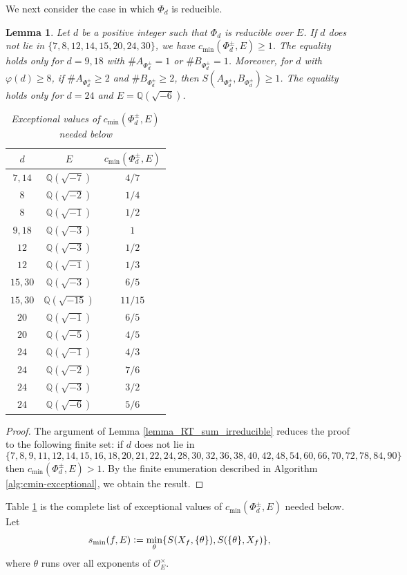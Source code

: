 \documentclass[11pt]{amsart}
\theoremstyle{plain}
\newtheorem{lem}[thm]{Lemma}
\theoremstyle{definition}
\numberwithin{equation}{section}
\def\OO{\mathscr{O}}
\newcommand{\bbQ}{\mathbb{Q}}
\newcommand{\defeq}{\vcentcolon=}
\begin{document}
We next consider the case in which $\Phi_d$ is reducible.
\begin{lem}\label{lemma_RT_sum_reducible}
  Let $d$ be a positive integer such that $\Phi_d$ is reducible over $E$.
  If $d$ does not lie in $\{7,8,12,14,15,20,24,30\}$, we have $c_{\min}(\Phi_d^\pm, E)\geq 1$.
  The equality holds only for $d = 9,18$ with $\#A_{\Phi^\pm_d} = 1$ or $\#B_{\Phi^\pm_d} = 1$.
  Moreover, for $d$ with $\varphi(d) \geq 8$, if $\#A_{\Phi^\pm_d}\geq2$ and $\#B_{\Phi^\pm_d}\geq2$, then
  $S(A_{\Phi^\pm_d},B_{\Phi^\pm_d}) \geq 1$.
  The equality holds only for $d=24$ and $E = \bbQ(\sqrt{-6})$.

\begin{table}[htbp]
  \centering
  \caption{Exceptional values of $c_{\min}(\Phi_d^\pm,E)$ needed below}
  \label{table_list_c<=1}
  \renewcommand{\arraystretch}{1.35}
  \setlength{\tabcolsep}{14pt}
  \begin{tabular}{ccc}
    \toprule
    $d$ & $E$ & $c_{\min}(\Phi_d^\pm,E)$ \\
    \midrule
    $7,14$ & $\bbQ(\sqrt{-7})$ & $4/7$ \\
    \addlinespace
    $8$ & $\bbQ(\sqrt{-2})$ & $1/4$ \\
    $8$ & $\bbQ(\sqrt{-1})$ & $1/2$ \\
    \addlinespace
    $9,18$ & $\bbQ(\sqrt{-3})$ & $1$ \\
    \addlinespace
    $12$ & $\bbQ(\sqrt{-3})$ & $1/2$ \\
    $12$ & $\bbQ(\sqrt{-1})$ & $1/3$ \\
    \addlinespace
    $15,30$ & $\bbQ(\sqrt{-3})$ & $6/5$ \\
    $15,30$ & $\bbQ(\sqrt{-15})$ & $11/15$ \\
    \addlinespace
    $20$ & $\bbQ(\sqrt{-1})$ & $6/5$ \\
    $20$ & $\bbQ(\sqrt{-5})$ & $4/5$ \\
    \addlinespace
    $24$ & $\bbQ(\sqrt{-1})$ & $4/3$ \\
    $24$ & $\bbQ(\sqrt{-2})$ & $7/6$ \\
    $24$ & $\bbQ(\sqrt{-3})$ & $3/2$ \\
    $24$ & $\bbQ(\sqrt{-6})$ & $5/6$ \\
    \bottomrule
  \end{tabular}
\end{table}
\end{lem}
\begin{proof}
  The argument of Lemma \ref{lemma_RT_sum_irreducible} reduces the proof to the following finite set: if $d$ does not lie in
  \[\{7,8,9,11,12,14,15,16,18,20,21,22,24,28,
    30,32,36,38,40,42,48,54,60,66,70,72,78,84,90\}\]
  then $c_{\min}(\Phi_d^\pm, E) > 1$.
  By the finite enumeration described in Algorithm \ref{alg:cmin-exceptional}, we obtain the result.

\end{proof}
  Table \ref{table_list_c<=1} is the complete list of exceptional values of $c_{\min}(\Phi_d^\pm, E)$ needed below.
Let
\[
s_{\min}(f,E) \defeq \min_{\theta}\{S(X_f, \{\theta\}), S(\{\theta\}, X_f)\},
\]
where $\theta$ runs over all exponents of $\OO_E^\times$.
\end{document}

